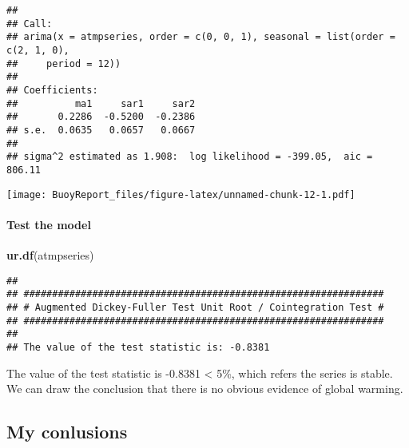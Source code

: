 \documentclass[]{article}
\newenvironment{Shaded}{\begin{snugshade}}{\end{snugshade}}
\newcommand{\DataTypeTok}[1]{\textcolor[rgb]{0.13,0.29,0.53}{#1}}
\newcommand{\DecValTok}[1]{\textcolor[rgb]{0.00,0.00,0.81}{#1}}
\newcommand{\KeywordTok}[1]{\textcolor[rgb]{0.13,0.29,0.53}{\textbf{#1}}}
\newcommand{\NormalTok}[1]{#1}
\newcommand{\OperatorTok}[1]{\textcolor[rgb]{0.81,0.36,0.00}{\textbf{#1}}}
\let\oldparagraph\paragraph
\renewcommand{\paragraph}[1]{\oldparagraph{#1}\mbox{}}
\begin{document}
\begin{verbatim}
## 
## Call:
## arima(x = atmpseries, order = c(0, 0, 1), seasonal = list(order = c(2, 1, 0), 
##     period = 12))
## 
## Coefficients:
##          ma1     sar1     sar2
##       0.2286  -0.5200  -0.2386
## s.e.  0.0635   0.0657   0.0667
## 
## sigma^2 estimated as 1.908:  log likelihood = -399.05,  aic = 806.11
\end{verbatim}

\begin{Shaded}
\end{Shaded}

\texttt{[image: BuoyReport\_files/figure-latex/unnamed-chunk-12-1.pdf]}

\hypertarget{test-the-model}{%
\paragraph{Test the model}\label{test-the-model}}

\begin{Shaded}
\begin{Highlighting}[]
\KeywordTok{ur.df}\NormalTok{(atmpseries)}
\end{Highlighting}
\end{Shaded}

\begin{verbatim}
## 
## ############################################################### 
## # Augmented Dickey-Fuller Test Unit Root / Cointegration Test # 
## ############################################################### 
## 
## The value of the test statistic is: -0.8381
\end{verbatim}

The value of the test statistic is -0.8381 \textless{} 5\%, which refers
the series is stable.\\
We can draw the conclusion that there is no obvious evidence of global
warming.

\hypertarget{my-conlusions}{%
\subsection{My conlusions}\label{my-conlusions}}
\end{document}
